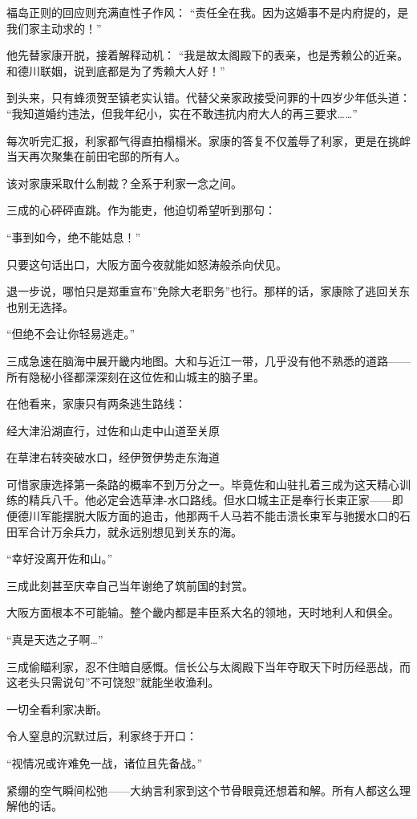 \documentclass[
]{article}
\begin{document}
福岛正则的回应则充满直性子作风：
``责任全在我。因为这婚事不是内府提的，是我们家主动求的！''

他先替家康开脱，接着解释动机：
``我是故太阁殿下的表亲，也是秀赖公的近亲。和德川联姻，说到底都是为了秀赖大人好！''

到头来，只有蜂须贺至镇老实认错。代替父亲家政接受问罪的十四岁少年低头道：
``我知道婚约违法，但我年纪小，实在不敢违抗内府大人的再三要求\ldots\ldots{}''

每次听完汇报，利家都气得直拍榻榻米。家康的答复不仅羞辱了利家，更是在挑衅当天再次聚集在前田宅邸的所有人。

该对家康采取什么制裁？全系于利家一念之间。

三成的心砰砰直跳。作为能吏，他迫切希望听到那句：

``事到如今，绝不能姑息！''

只要这句话出口，大阪方面今夜就能如怒涛般杀向伏见。

退一步说，哪怕只是郑重宣布''免除大老职务''也行。那样的话，家康除了逃回关东也别无选择。

``但绝不会让你轻易逃走。''

三成急速在脑海中展开畿内地图。大和与近江一带，几乎没有他不熟悉的道路------所有隐秘小径都深深刻在这位佐和山城主的脑子里。

在他看来，家康只有两条逃生路线：

经大津沿湖直行，过佐和山走中山道至关原

在草津右转突破水口，经伊贺伊势走东海道

可惜家康选择第一条路的概率不到万分之一。毕竟佐和山驻扎着三成为这天精心训练的精兵八千。他必定会选草津-水口路线。但水口城主正是奉行长束正家------即便德川军能摆脱大阪方面的追击，他那两千人马若不能击溃长束军与驰援水口的石田军合计万余兵力，就永远别想见到关东的海。

``幸好没离开佐和山。''

三成此刻甚至庆幸自己当年谢绝了筑前国的封赏。

大阪方面根本不可能输。整个畿内都是丰臣系大名的领地，天时地利人和俱全。

``真是天选之子啊\ldots{}''

三成偷瞄利家，忍不住暗自感慨。信长公与太阁殿下当年夺取天下时历经恶战，而这老头只需说句''不可饶恕''就能坐收渔利。

一切全看利家决断。

令人窒息的沉默过后，利家终于开口：

``视情况或许难免一战，诸位且先备战。''

紧绷的空气瞬间松弛------大纳言利家到这个节骨眼竟还想着和解。所有人都这么理解他的话。
\end{document}
